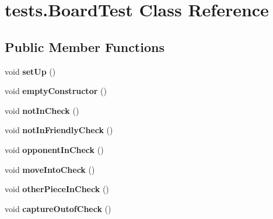 \hypertarget{classtests_1_1_board_test}{\section{tests.\-Board\-Test Class Reference}
\label{classtests_1_1_board_test}
}
\subsection*{Public Member Functions}
\begin{DoxyCompactItemize}
\item 
\hypertarget{classtests_1_1_board_test_aa4971a32f439d2f67389bece2188dbcb}{void {\bfseries set\-Up} ()}\label{classtests_1_1_board_test_aa4971a32f439d2f67389bece2188dbcb}

\item 
\hypertarget{classtests_1_1_board_test_a49f3b5804a7cfed3694c2f8271a05a00}{void {\bfseries empty\-Constructor} ()}\label{classtests_1_1_board_test_a49f3b5804a7cfed3694c2f8271a05a00}

\item 
\hypertarget{classtests_1_1_board_test_acc9d9fa00e3ba979f9f04c35dcd81804}{void {\bfseries not\-In\-Check} ()}\label{classtests_1_1_board_test_acc9d9fa00e3ba979f9f04c35dcd81804}

\item 
\hypertarget{classtests_1_1_board_test_a0bfa72527d05a54277a27a836852fa38}{void {\bfseries not\-In\-Friendly\-Check} ()}\label{classtests_1_1_board_test_a0bfa72527d05a54277a27a836852fa38}

\item 
\hypertarget{classtests_1_1_board_test_a49cb96d5a1c4226909eb206886f5efe2}{void {\bfseries opponent\-In\-Check} ()}\label{classtests_1_1_board_test_a49cb96d5a1c4226909eb206886f5efe2}

\item 
\hypertarget{classtests_1_1_board_test_a82597a3ce2954e6dc0455935a5afb6ae}{void {\bfseries move\-Into\-Check} ()}\label{classtests_1_1_board_test_a82597a3ce2954e6dc0455935a5afb6ae}

\item 
\hypertarget{classtests_1_1_board_test_a746ead936beecae91bff6cb7a7a559cb}{void {\bfseries other\-Piece\-In\-Check} ()}\label{classtests_1_1_board_test_a746ead936beecae91bff6cb7a7a559cb}

\item 
\hypertarget{classtests_1_1_board_test_a255c1c93dc99704f27cbc9b5f6204a7f}{void {\bfseries capture\-Outof\-Check} ()}\label{classtests_1_1_board_test_a255c1c93dc99704f27cbc9b5f6204a7f}


\end{DoxyCompactItemize}
